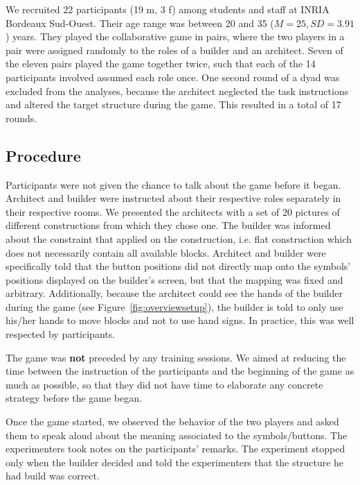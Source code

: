 We recruited 22 participants (19 m, 3 f) among students and staff at INRIA Bordeaux Sud-Ouest. Their age range was between 20 and 35 ($M = 25, SD = 3.91$) years. They played the collaborative game in pairs, where the two players in a pair were assigned randomly to the roles of a builder and an architect. Seven of the eleven pairs played the game together twice, such that each of the 14 participants involved assumed each role once. One second round of a dyad was excluded from the analyses, because the architect neglected the task instructions and altered the target structure during the game. This resulted in a total of 17 rounds.

\subsection{Procedure}
\label{sec:procedure}
Participants were not given the chance to talk about the game before it began. Architect and builder were instructed about their respective roles separately in their respective rooms. We presented the architects with a set of 20 pictures of different constructions from which they chose one. The builder was informed about the constraint that applied on the construction, i.e. flat construction which does not necessarily contain all available blocks. Architect and builder were specifically told that the button positions did not directly map onto the symbols' positions displayed on the builder's screen, but that the mapping was fixed and arbitrary. Additionally, because the architect could see the hands of the builder during the game (see Figure~\ref{fig:overviewsetup}), the builder is told to only use his/her hands to move blocks and not to use hand signs. In practice, this was well respected by participants.

The game was \textbf{not} preceded by any training sessions. We aimed at reducing the time between the instruction of the participants and the beginning of the game as much as possible, so that they did not have time to elaborate any concrete strategy before the game began. 

Once the game started, we observed the behavior of the two players and asked them to speak aloud about the meaning associated to the symbols/buttons. The experimenters took notes on the participants' remarks. The experiment stopped only when the builder decided and told the experimenters that the structure he had build was correct.



